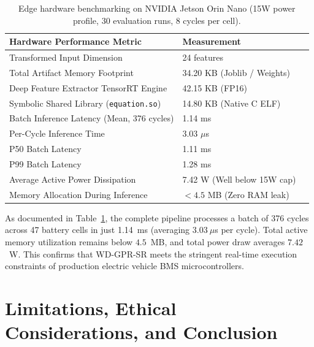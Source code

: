 \documentclass[a4paper,fleqn]{cas-sc}
\begin{document}
\begin{table}[htbp]
\centering
\caption{Edge hardware benchmarking on NVIDIA Jetson Orin Nano (15W power profile, 30 evaluation runs, 8 cycles per cell).}
\label{tab:hardware_benchmarks}
\footnotesize
\renewcommand{\arraystretch}{1.15}
\begin{tabular*}{\linewidth}{@{\extracolsep{\fill}}llc@{}}
\toprule
\textbf{Hardware Performance Metric} & \textbf{Measurement} \\
\midrule
Transformed Input Dimension & 24 features \\
Total Artifact Memory Footprint & 34.20 KB (Joblib / Weights) \\
Deep Feature Extractor TensorRT Engine & 42.15 KB (FP16) \\
Symbolic Shared Library (\texttt{equation.so}) & 14.80 KB (Native C ELF) \\
Batch Inference Latency (Mean, 376 cycles) & 1.14 ms \\
Per-Cycle Inference Time & 3.03 $\mu$s \\
P50 Batch Latency & 1.11 ms \\
P99 Batch Latency & 1.28 ms \\
Average Active Power Dissipation & 7.42 W (Well below 15W cap) \\
Memory Allocation During Inference & $< 4.5$ MB (Zero RAM leak) \\
\bottomrule
\end{tabular*}
\end{table}

As documented in Table~\ref{tab:hardware_benchmarks}, the complete pipeline processes a batch of 376 cycles across 47 battery cells in just 1.14~ms (averaging $3.03~\mu$s per cycle). Total active memory utilization remains below $4.5$~MB, and total power draw averages $7.42$~W. This confirms that WD-GPR-SR meets the stringent real-time execution constraints of production electric vehicle BMS microcontrollers.

\section{Limitations, Ethical Considerations, and Conclusion}
\end{document}
